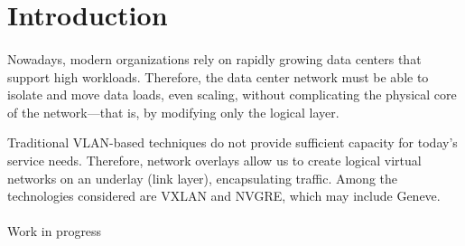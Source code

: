 \section{Introduction}
\paragraph{}
Nowadays, modern organizations rely on rapidly growing data centers that support high workloads. Therefore, the data center network must be able to isolate and move data loads, even scaling, without complicating the physical core of the network—that is, by modifying only the logical layer.\par
Traditional VLAN-based techniques do not provide sufficient capacity for today's service needs. Therefore, network overlays allow us to create logical virtual networks on an underlay (link layer), encapsulating traffic. Among the technologies considered are VXLAN and NVGRE, which may include Geneve.
\paragraph{}
Work in progress